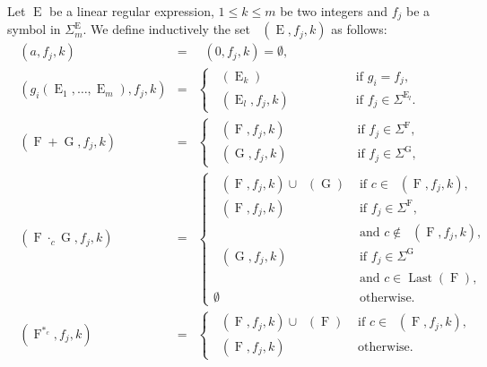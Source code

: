 \documentclass{llncs}
\DeclareMathOperator{\Last}{Last}
\DeclareMathOperator{\last}{Fl_0}
\DeclareMathOperator{\Follw}{Fl_>}
\DeclareMathOperator{\E}{E}
\DeclareMathOperator{\f}{F}
\DeclareMathOperator{\G}{G}
\DeclareMathOperator{\Fir}{Fr_>}
\def\firstt#1{\Fir{(#1)}}
\def\las#1#2#3{\last{(#1,#2,#3)}}
\def\Fw#1#2#3{\Follw{(#1,#2,#3)}}
\begin{document}
\begin{proposition}
\label{x}
Let $\E$ be a linear regular expression, $1\leq k\leq m$ be two integers and $f_j$ be a symbol in $\Sigma^{\E}_m$.  
We define inductively the set $\Fw{\E}{f_j}{k}$ as follows:
\begin{eqnarray*}
\Fw{a}{f_j}{k}&=&\Fw{0}{f_j}{k}=\emptyset, \\
 \Fw{g_i(\E_1, \dots,\E_m)}{f_j}{k}&=&
 \left\{
\begin{array}{ll}
\displaystyle\firstt{\E_k}&\;\;\;\;\;\;\;\;\;\;\;\;\;\;\;\mbox{ if } g_i=f_j,\\ 
\Fw{\E_l}{f_j}{k}&\;\;\;\;\;\;\;\;\;\;\;\;\;\;\;\mbox{ if } f_j\in \Sigma^{\E_l}.
\end{array}\right.\\
\Fw{\f+\G}{f_j}{k}&=&\left\{
\begin{array}{ll}
\Fw{\f}{f_j}{k} &\;\;\;\;\;\;\;\;\;\;\;\;\;\;\;\;\mbox{ if }f_j\in \Sigma^{\f}, \\ 
\Fw{\G}{f_j}{k}&\;\;\;\;\;\;\;\;\;\;\;\;\;\;\;\;\mbox{ if } f_j\in \Sigma^{\G},
\end{array}\right.\\
\Fw{\f\cdot_c \G}{f_j}{k}&=&\left\{
\begin{array}{ll}
\Fw{\f}{f_j}{k}\cup\firstt{\G}&\mbox{ if }c\in \las{\f}{f_j}{k},\\
\Fw{\f}{f_j}{k}&\mbox{ if } f_j\in \Sigma^{\f},\\
&\mbox{ and } c\notin \las{\f}{f_j}{k}, \\
\Fw{\G}{f_j}{k}&\mbox{ if } f_j\in \Sigma^{\G}\\
&\mbox{ and } c\in  \Last(\f),\\
\emptyset&\mbox{ otherwise.}
\end{array}\right.\\
\Fw{{\f}^{*_c}}{f_j}{k}&=&\left\{
\begin{array}{ll}
\Fw{\f}{f_j}{k}\cup\firstt{\f}&\mbox{ if }c\in \las{\f}{f_j}{k},\\
\Fw{\f}{f_j}{k}&\mbox{ otherwise.}
\end{array}\right.\\
\end{eqnarray*}
\end{proposition}
\end{document}
